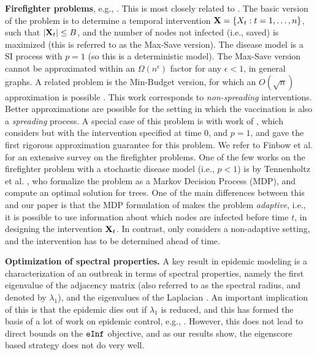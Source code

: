 \noindent
\textbf{Firefighter problems}, e.g., \cite{anshelevich09,Finbow2009TheFP,Chalermsook:2010:RMF:1873601.1873709}. 
This is most closely related to \prob{}. The basic version of the problem is to
determine a temporal intervention $\mathbf{X}=\{X_t: t=1,\ldots,n\}$, such that $|\mathbf{X}_t|\leq B$,
and the number of nodes not infected (i.e., saved) is maximized (this is referred to as the Max-Save version).
The disease model is a SI process with $p=1$ (so this is a deterministic model).
The Max-Save version cannot be approximated within an $\Omega(n^{\epsilon})$ factor for any $\epsilon < 1$, in general graphs.
A related problem is the Min-Budget version, for which an $O(\sqrt{n})$ approximation is 
possible \cite{Chalermsook:2010:RMF:1873601.1873709}.
This work corresponds to \emph{non-spreading} interventions. Better approximations are possible for the setting in which
the vaccination is also a \emph{spreading} process.
A special case of this problem is with work of \cite{Aspnes:2005}, which considers \prob{} but with
the intervention specified at time 0, and $p=1$, and gave the first rigorous approximation guarantee for this problem.
We refer to Finbow et al. \cite{Finbow2009TheFP} for an extensive survey on the firefighter problems.
One of the few works on the firefighter problem with a stochastic disease model (i.e., $p<1$) is by
Tennenholtz et al. \cite{DBLP:journals/corr/abs-1711-08237}, who formalize the problem as a Markov Decision Process (MDP),
and compute an optimal solution for trees.  One of the main differences between this and our paper is that
the MDP formulation of \cite{DBLP:journals/corr/abs-1711-08237} makes the problem \emph{adaptive},
i.e., it is possible to use information about which nodes are infected before time $t$, in designing 
the intervention $\mathbf{X}_t$. In contrast, \prob{} only considers a non-adaptive setting, and the intervention
has to be determined ahead of time.

\noindent
\textbf{Optimization of spectral properties.}
A key result in epidemic modeling is a characterization of an outbreak in terms of spectral properties,
namely the first eigenvalue of the adjacency matrix (also referred to as the spectral radius, and denoted by $\lambda_1$),
and the eigenvalues of the Laplacian \cite{Prakash@ICDM11,ganesh+topology05, wang+eigenvalue03}.
An important implication of this is that the epidemic dies out if $\lambda_1$ is reduced, and this has
formed the basis of a lot of work on epidemic control, e.g., 
\cite{PreciadoVM13_2,PreciadoVM13,PreciadoVM14,SahaSDM15,Ogura2017,zhang2015controlling,YaoSDM2014}. 
However, this does not lead to direct bounds on the $\texttt{eInf}$ objective, and as our results show,
the eigenscore based strategy does not do very well.

